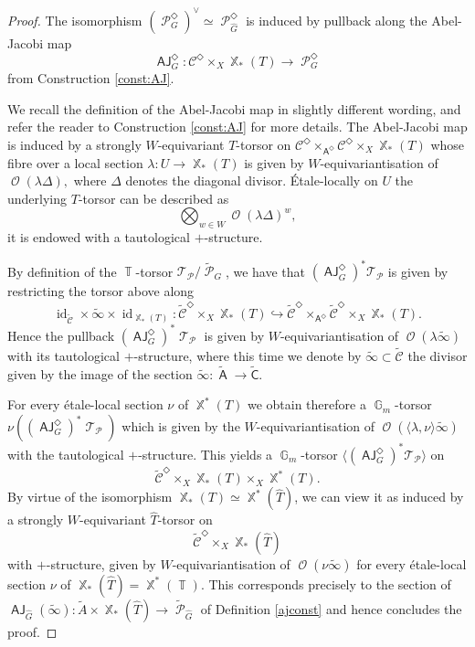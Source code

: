 \documentclass{article}
\DeclareMathOperator{\A}{\mathsf{A}}
\newcommand{\Cc}{\mathcal{C}}
\newcommand{\C}{\mathsf{C}}
\DeclareMathOperator{\id}{id}
\DeclareMathOperator{\Tt}{\mathcal{T}}
\DeclareMathOperator{\Xb}{\mathbb{X}}
\DeclareMathOperator{\G}{\mathbb{G}}
\DeclareMathOperator{\Tb}{\mathbb{T}}
\DeclareMathOperator{\Pc}{\mathcal{P}}
\DeclareMathOperator{\Oo}{\mathcal{O}}
\DeclareMathOperator{\AJ}{\mathsf{AJ}}
\theoremstyle{definition}
\theoremstyle{plain}
\begin{document}
\begin{proof}
The isomorphism $(\Pc_G^{\Diamond})^{\vee} \simeq \Pc^{\Diamond}_{\widehat{G}}$ is induced by pullback along the Abel-Jacobi map
\begin{equation*}
  \AJ_{{G}}^{\Diamond} \colon \Cc^\Diamond \times_X \Xb_*({T})\to \Pc_{{G}}^{\Diamond}
\end{equation*} 
from Construction \ref{const:AJ}.

We recall the definition of the Abel-Jacobi map in slightly different wording, and refer the reader to Construction \ref{const:AJ} for more details. The Abel-Jacobi map is induced by a strongly $W$-equivariant $T$-torsor on $\Cc^{\Diamond} \times_{\A^{\Diamond}} \Cc^{\Diamond} \times_X \Xb_*({T})$ whose fibre over a local section $\lambda\colon U \to \Xb_*({T})$ is given by 
$W$-equivariantisation of $\Oo(\lambda \Delta),$ where $\Delta$ denotes the diagonal divisor. \'Etale-locally on $U$ the underlying $T$-torsor can be described as
$$\bigotimes_{w \in W} \Oo(\lambda \Delta)^w,$$
it is endowed with a tautological $+$-structure.

By definition of the ${\Tb}$-torsor $\mathcal{T}_{\Pc}/\widetilde{\Pc}_{{G}}$,  we have that $(\AJ_{{G}}^\Diamond)^*\mathcal{T}_{\Pc}$ is given by restricting the torsor above along 
$$\id_{\widetilde{\Cc}} \times \widetilde{\infty} \times \id_{\Xb_*(T)} \colon \widetilde{\Cc}^{\Diamond}   \times_X \Xb_*({T}) \hookrightarrow \widetilde{\Cc}^{\Diamond} \times_{\A^{\Diamond}} \widetilde{\Cc}^{\Diamond} \times_X \Xb_*({T}).$$
Hence the pullback $(\AJ_{{G}}^{\Diamond})^*\Tt_{\Pc}$ is given by $W$-equivariantisation of $\Oo(\lambda \widetilde{\infty})$ with its tautological $+$-structure, where this time we denote by $\widetilde{\infty} \subset \widetilde{\Cc}$ the divisor given by the image of the section $\widetilde{\infty} \colon \widetilde{\A} \to \widetilde{\C}$.

For every \'etale-local section $\nu$ of $\Xb^*(T)$ we obtain therefore a $\G_m$-torsor $\nu((\AJ_{{G}}^{\Diamond})^*\Tt_{\Pc})$ which is given by the $W$-equivariantisation of $\Oo(\langle \lambda, \nu \rangle \widetilde{\infty})$ with the tautological $+$-structure. This yields a $\G_m$-torsor $\langle (\AJ_{{G}}^{\Diamond})^*\mathcal{T}_{\Pc} \rangle$ on 
$$\widetilde{\Cc}^{\Diamond}   \times_X \Xb_*({T}) \times_X \Xb^*(T).$$
By virtue of the isomorphism $\Xb_*(T) \simeq \Xb^*(\widehat{T})$, we can view it as induced by a strongly $W$-equivariant $\widehat{T}$-torsor on
$$\widetilde{\Cc}^{\Diamond}   \times_X \Xb_*(\widehat{T})$$
with $+$-structure, given by $W$-equivariantisation of $\Oo(\nu \widetilde{\infty})$ for every \'etale-local section $\nu$ of $\Xb_*(\widehat{T}) = \Xb^*(\Tb)$. This corresponds precisely to the section of $\AJ_{\widehat{G}}(\widetilde{\infty})\colon \widetilde{A} \times \Xb_*(\widehat{T}) \to \widetilde{\Pc}_{\widehat{G}}$ of Definition \eqref{ajconst} and hence concludes the proof.
\end{proof}
\end{document}
